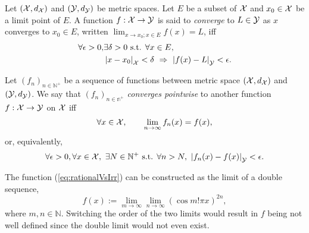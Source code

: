 \begin{defn}
  \label{def:limitingValueOfAfunc}
  Let $({\cal X}, d_{{\cal X}})$
   and $({\cal Y}, d_{{\cal Y}})$ be metric spaces.
  Let $E$ be a subset of ${\cal X}$
   and $x_0\in {\cal X}$ be a limit point of $E$.
  A function $f:{\cal X}\rightarrow {\cal Y}$
   is said to \emph{converge} to $L\in {\cal Y}$
   as $x$ converges to $x_0\in E$,
   written
     $\lim_{x\rightarrow x_0; x\in E} f(x) = L$,
   iff
   \begin{align}
     \nonumber
     \forall \epsilon>0, &\exists \delta>0 \text{ s.t. }
     \forall x\in E,\ 
     \\      \label{eq:limitingValueOfAfuncCond}
     &\left|x-x_0\right|_{{\cal X}} < \delta
      \ \Rightarrow\ 
     \left|f(x)- L\right|_{{\cal Y}} < \epsilon.
   \end{align}
\end{defn}


\begin{defn}
  \label{def:pointwiseConvergence}
  Let $(f_n)_{n\in\mathbb{N}^+}$ be a sequence of functions
   between metric space $({\cal X}, d_{{\cal X}})$
   and $({\cal Y}, d_{{\cal Y}})$.
  We say that $(f_n)_{n\in\mathbb{n}^+}$ \emph{converges pointwise}
   to another function $f:{\cal X}\rightarrow{\cal Y}$ on ${\cal X}$ iff
   \begin{equation}
     \label{eq:pointwiseConvergence1}
     \forall x\in {\cal X},\qquad
     \lim_{n\rightarrow \infty} f_n(x) =  f(x),
   \end{equation}
   or, equivalently, 
   \begin{equation}
     \label{eq:pointwiseConvergence2}
     \forall \epsilon>0, 
      \forall x\in {\cal X},\ 
       \exists N\in \mathbb{N}^+ \text{ s.t. } \forall n>N,\ 
       \left|f_n(x)- f(x)\right|_{{\cal Y}} < \epsilon.
   \end{equation}
\end{defn}

\begin{exm}
  The function (\ref{eq:rationalVsIrr}) can be constructed
  as the limit of a double sequence, 
  \begin{equation}
    \label{eq:construcRatVsIrrat}
    f(x) := \lim_{m\rightarrow \infty} \lim_{n\rightarrow \infty}
    (\cos m!\pi x)^{2n}, 
  \end{equation}
  where $m,n\in \mathbb{N}$.
  Switching the order of the two limits 
  would result in $f$ being not well defined
  since the double limit would not even exist.
\end{exm}

